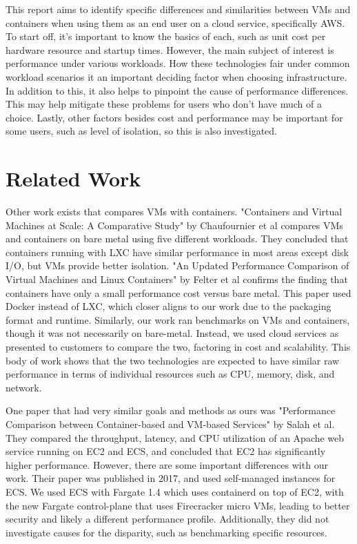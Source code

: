 \documentclass[11pt]{article}
\begin{document}
This report aims to identify specific differences and similarities between VMs and containers when using them as an end user on a cloud service, specifically AWS. To start off, it's important to know the basics of each, such as unit cost per hardware resource and startup times. However, the main subject of interest is performance under various workloads. How these technologies fair under common workload scenarios it an important deciding factor when choosing infrastructure. In addition to this, it also helps to pinpoint the cause of performance differences. This may help mitigate these problems for users who don't have much of a choice. Lastly, other factors besides cost and performance may be important for some users, such as level of isolation, so this is also investigated.


\section{Related Work}

Other work exists that compares VMs with containers. "Containers and Virtual Machines at Scale: A Comparative Study" by Chaufournier et al compares VMs and containers on bare metal using five different workloads. They concluded that containers running with LXC have similar performance in most areas except disk I/O, but VMs provide better isolation. "An Updated Performance Comparison of Virtual Machines and Linux Containers" by Felter et al confirms the finding that containers have only a small performance cost versus bare metal. This paper used Docker instead of LXC, which closer aligns to our work due to the packaging format and runtime. Similarly, our work ran benchmarks on VMs and containers, though it was not necessarily on bare-metal. Instead, we used cloud services as presented to customers to compare the two, factoring in cost and scalability. This body of work shows that the two technologies are expected to have similar raw performance in terms of individual resources such as CPU, memory, disk, and network.

One paper that had very similar goals and methods as ours was "Performance Comparison between Container-based and VM-based Services" by Salah et al. They compared the throughput, latency, and CPU utilization of an Apache web service running on EC2 and ECS, and concluded that EC2 has significantly higher performance. However, there are some important differences with our work. Their paper was published in 2017, and used self-managed instances for ECS. We used ECS with Fargate 1.4 which uses containerd on top of EC2, with the new Fargate control-plane that uses Firecracker micro VMs, leading to better security and likely a different performance profile. Additionally, they did not investigate causes for the disparity, such as benchmarking specific resources.
\end{document}
